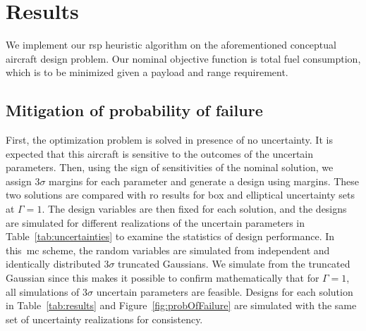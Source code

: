 \section{Results}

We implement our \gls{rsp} heuristic algorithm on the aforementioned conceptual aircraft design problem.
Our nominal objective function is total fuel consumption, which is
to be minimized given a payload and range requirement.

\subsection{Mitigation of probability of failure}

First, the optimization problem is solved in presence of no uncertainty. It is expected
that this aircraft is sensitive to the outcomes of the uncertain parameters. Then, using the sign of
sensitivities of the nominal solution, we assign $3\sigma$ margins for each parameter
and generate a design using margins. These two solutions are compared with \gls{ro} results for
box and elliptical uncertainty sets at $\Gamma = 1$.
The design variables are then fixed for each solution, and the designs are simulated for
different realizations of the uncertain parameters in Table~\ref{tab:uncertainties}
to examine the statistics of design performance. In this~\gls{mc} scheme, the random variables
are simulated from independent and identically distributed $3\sigma$ truncated Gaussians.
We simulate from the truncated Gaussian since this makes it possible to
confirm mathematically that for $\Gamma = 1$, all simulations of $3\sigma$ uncertain parameters are feasible.
Designs for each solution in Table~\ref{tab:results} and Figure~\ref{fig:probOfFailure} are simulated with the same set
of uncertainty realizations for consistency. \\

